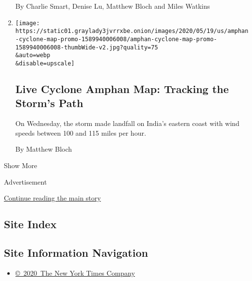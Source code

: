 \begin{enumerate}
  By Charlie Smart, Denise Lu, Matthew Bloch and Miles Watkins
\item
  \href{/interactive/2020/05/19/world/asia/amphan-cyclone-map.html}{}

  \texttt{[image: https://static01.graylady3jvrrxbe.onion/images/2020/05/19/us/amphan-cyclone-map-promo-1589940006008/amphan-cyclone-map-promo-1589940006008-thumbWide-v2.jpg?quality=75\\\&auto=webp\\\&disable=upscale]}

  \hypertarget{live-cyclone-amphan-map-tracking-the-storms-path}{%
  \subsection{Live Cyclone Amphan Map: Tracking the Storm's
  Path}\label{live-cyclone-amphan-map-tracking-the-storms-path}}

  On Wednesday, the storm made landfall on India's eastern coast with
  wind speeds between 100 and 115 miles per hour.

  By Matthew Bloch
\end{enumerate}

Show More

Advertisement

\protect\hyperlink{after-mid2}{Continue reading the main story}

\hypertarget{site-index}{%
\subsection{Site Index}\label{site-index}}

\hypertarget{site-information-navigation}{%
\subsection{Site Information
Navigation}\label{site-information-navigation}}

\begin{itemize}
\tightlist
\item
  \href{https://help.nytimes3xbfgragh.onion/hc/en-us/articles/115014792127-Copyright-notice}{©~2020~The
  New York Times Company}
\end{itemize}

